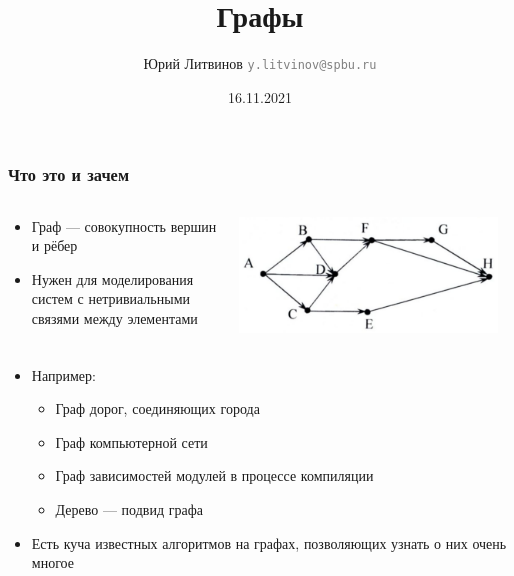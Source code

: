 \documentclass[xetex,mathserif,serif]{beamer}
\title{Графы}
\author[Юрий Литвинов]{Юрий Литвинов \newline \textcolor{gray}{\small\texttt{y.litvinov@spbu.ru}}}
\date{16.11.2021}
\begin{document}
    
    \frame{\titlepage}

    \begin{frame}
        \frametitle{Что это и зачем}
        \begin{columns}
            \begin{column}{0.4\textwidth}
                \begin{itemize}
                    \item Граф --- совокупность вершин и рёбер
                    \item Нужен для моделирования систем с нетривиальными связями между элементами
                \end{itemize}
            \end{column}
            \begin{column}{0.6\textwidth}
                \begin{center}
                    \includegraphics[width=0.95\textwidth]{graph.png}
                \end{center}
            \end{column}
        \end{columns}
        \begin{itemize}
            \item Например:
            \begin{itemize}
                \item Граф дорог, соединяющих города
                \item Граф компьютерной сети
                \item Граф зависимостей модулей в процессе компиляции
                \item Дерево --- подвид графа
            \end{itemize}
            \item Есть куча известных алгоритмов на графах, позволяющих узнать о них очень многое
        \end{itemize}
    \end{frame}
\end{document}

